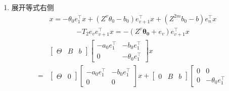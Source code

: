 \documentclass[a4paper,12pt]{article}
\begin{document}
\begin{enumerate}
\begin{align*}
        \left[
        \begin{array}{c|c}
        -a_0e_1^\top & -b_0e_1^\top\\ \hline
        0 & -\theta_0e_1^\top 
        \end{array}
        \right]
        x + \begin{bmatrix}
            b_0 \\ 0
        \end{bmatrix} 
        (u-\varepsilon)
        \right)
    \end{align*}
    \item 展开等式右侧
    \begin{align*}
        [-{\theta_0}e_1^\top 
        +(Z^v{\theta_0}-{b_0})e_{v+1}^\top
        +(Z^{2m}{b_0}-{b})e_n^\top]x
        = -{\theta_0}e_1^\top x
        +(Z^v{\theta_0}-{b_0})e_{v+1}^\top x
        +(Z^{2m}{b_0}-{b})e_n^\top x
    \end{align*}
    \begin{align*}
        -T_2 e_ve_{v+1}^\top x 
        = - (Z^v\boldsymbol{\theta_0}+e_v)e_{v+1}^\top x
    \end{align*}
    \begin{align*}
        & \left[
        \begin{array}{c|cc}
        \Theta & B & b
        \end{array}
        \right]
        \left[
        \begin{array}{c|c}
        -a_0e_1^\top & -b_0e_1^\top\\ \hline
        0 & -\theta_0e_1^\top 
        \end{array}
        \right] x
        \\ = &
            \left[
            \begin{array}{c|c}
            \Theta & 0
            \end{array}
            \right]
            \left[
            \begin{array}{c|c}
            -a_0e_1^\top & -b_0e_1^\top\\ \hline
            0 & 0
            \end{array}
            \right] x +
            \left[
            \begin{array}{c|cc}
            0 & B & b
            \end{array}
            \right]
            \left[
            \begin{array}{c|c}
            0 & 0\\ \hline
            0 & -\theta_0e_1^\top 

\end{array}
\end{align*}
\end{enumerate}
\end{document}
